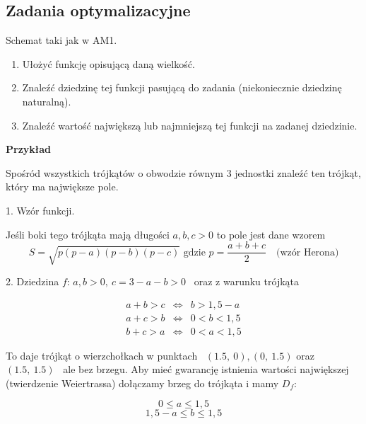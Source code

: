 \subsection*{Zadania optymalizacyjne}

Schemat taki jak w AM1.
\begin{enumerate}
    \item Ułożyć funkcję opisującą daną wielkość.
    \item Znaleźć dziedzinę tej funkcji pasującą do zadania (niekoniecznie dziedzinę naturalną).
    \item Znaleźć wartość największą lub najmniejszą tej funkcji na zadanej dziedzinie.
\end{enumerate}
\bigskip

\textbf{Przykład}

Spośród wszystkich trójkątów o obwodzie równym $3$ jednostki znaleźć ten trójkąt, który ma największe pole.
\medskip

1. Wzór funkcji.

Jeśli boki tego trójkąta mają długości $a,b,c > 0$ to pole jest dane wzorem
\[ S = \sqrt{p(p-a)(p-b)(p-c)} \textrm{ \ gdzie \ } p = \frac{a+b+c}{2} \quad \textrm{(wzór Herona)} \]
\medskip

2. Dziedzina $f$: $ a,b > 0, \ c = 3 - a - b > 0 $ \ oraz z warunku trójkąta

\[ \begin{array}{ccc} 
    a+b>c & \Leftrightarrow & b > 1,5 - a \\
    a+c>b & \Leftrightarrow & 0 < b < 1,5 \\
    b+c>a & \Leftrightarrow & 0 < a < 1,5
\end{array} \]

To daje trójkąt o wierzchołkach w punktach \ $(1.5, \ 0), (0, \ 1.5)$ oraz $(1.5, \ 1.5)$ \ ale bez brzegu.
Aby mieć gwarancję istnienia wartości największej (twierdzenie Weiertrassa) dołączamy brzeg do trójkąta i mamy $D_f$:

\[ 0 \leq a \leq 1,5 \]
\[ 1,5 - a \leq b \leq 1,5 \]

